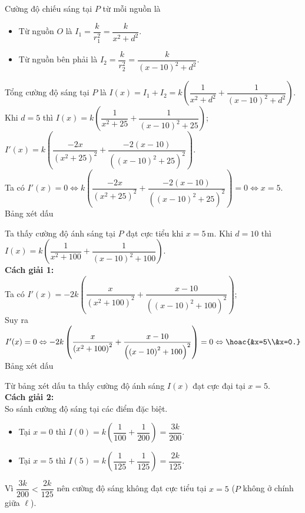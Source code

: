 \begin{ex}
{\begin{itemchoice}
			\itemch  Cường độ chiếu sáng tại $P$ từ mỗi nguồn là
			\begin{itemize}
				\item Từ nguồn $O$ là  $I_1=\dfrac{k}{r_1^2}=\dfrac{k}{x^2+d^2}$.
				\item Từ nguồn bên phải  là $I_2=\dfrac{k}{r_2^2}=\dfrac{k}{(x-10)^2+d^2}$.
			\end{itemize}
			Tổng cường  độ sáng tại $P$ là $I(x)=I_1+I_2=k\left(\dfrac{1}{x^2+d^2}+\dfrac{1}{(x-10)^2+d^2}\right)$.
			\itemch Khi  $d=5$ thì $I(x)=k\left(\dfrac{1}{x^2+25}+\dfrac{1}{(x-10)^2+25}\right)$;\\
			$I'(x)=k\left(\dfrac{-2x}{(x^2+25)^2}+\dfrac{-2(x-10)}{((x-10)^2+25)^2}\right)$.\\ 
			Ta có $I'(x)=0 \Leftrightarrow k\left(\dfrac{-2x}{(x^2+25)^2}+\dfrac{-2(x-10)}{((x-10)^2+25)^2}\right)=0  \Leftrightarrow x=5$.\\
			Bảng  xét dấu
			\begin{center}
			\end{center}
			Ta thấy cường độ ánh sáng tại $P$ đạt  cực tiểu khi $x=5$\,m.
			\itemch 
			Khi $d=10$ thì  $I(x)=k\left(\dfrac{1}{x^2+100}+\dfrac{1}{(x-10)^2+100}\right)$.\\
			 \textbf{Cách giải 1:} \\
			Ta  có $I'(x)=-2k\left(\dfrac{x}{\left(x^2+100\right)^{2}}+\dfrac{x-10}{\left(\left(x-10\right)^{2}+100\right)^{2}}\right)$;\\
			Suy ra $I'(x)=0 \Leftrightarrow  -2k\left(\dfrac{x}{\left(x^2+100\right)^{2}}+\dfrac{x-10}{\left(\left(x-10\right)^{2}+100\right)^{2}}\right)=0 \Leftrightarrow \hoac{&x=5\\&x=0.}$\\
			Bảng xét  dấu
			\begin{center}
			\end{center}
			Từ bảng xét dấu ta thấy  cường độ ánh sáng $I(x)$ đạt cực đại tại $x=5$.\\
			\textbf{Cách giải 2:}  \\
			So sánh cường độ sáng tại các điểm đặc biệt. 
			\begin{itemize}
				\item Tại $x=0$ thì $I(0)=k\left(\dfrac{1}{100}+\dfrac{1}{200}\right)=\dfrac{3k}{200}$. 
				\item  Tại $x=5$ thì $I(5)=k\left(\dfrac{1}{125}+\dfrac{1}{125}\right)=\dfrac{2k}{125}$.
			\end{itemize}
			Vì $\dfrac{3k}{200} < \dfrac{2k}{125}$ nên cường độ sáng không  đạt cực tiểu tại $x=5$ ($P$ không ở chính giữa $\ell$).
	\end{itemchoice}	}
\end{ex}

